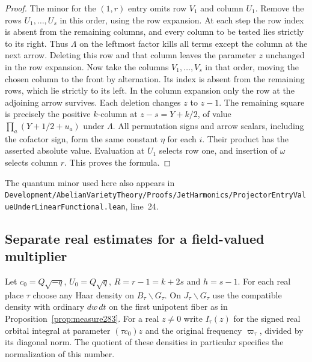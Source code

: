 \documentclass[a4paper,11pt]{article}
\theoremstyle{definition}
\theoremstyle{remark}
\newcommand{\srcloc}[2]{{\small\nolinkurl{#1.lean}}, line~#2}
\numberwithin{equation}{section}
\begin{document}
\begin{proof}
The minor for the \((1,r)\) entry omits row \(V_1\) and
column \(U_1\). Remove the rows \(U_1,\ldots,U_s\) in this
order, using the row expansion. At each step the row index is
absent from the remaining columns, and every column to be tested
lies strictly to its right. Thus \(\Lambda\) on the leftmost
factor kills all terms except the column at the next arrow.
Deleting this row and that column leaves the parameter \(z\)
unchanged in the row expansion. Now take the columns
\(V_1,\ldots,V_s\) in that order, moving the chosen column to
the front by alternation. Its index is absent from the remaining
rows, which lie strictly to its left. In the column expansion
only the row at the adjoining arrow survives. Each deletion
changes \(z\) to \(z-1\). The remaining square is precisely the
positive \(k\)-column at \(z-s=Y+k/2\), of value
\(\prod_a(Y+1/2+u_a)\) under \(\Lambda\).
All permutation signs and arrow scalars, including the cofactor
sign, form the same constant \(\eta\) for each \(i\). Their
product has the asserted absolute value. Evaluation at \(U_1\)
selects row one, and insertion of \(\omega\) selects column \(r\).
This proves the formula.
\end{proof}

The quantum minor used here also appears in
\srcloc{Development/AbelianVarietyTheory/Proofs/JetHarmonics/ProjectorEntryValueUnderLinearFunctional}{24}.

\subsection{Separate real estimates for a field-valued multiplier}\label{nav:V-50}
Let \(c_0=Q\sqrt{-q}\), \(U_0=Q\sqrt q\),
\(R=r-1=k+2s\) and \(h=s-1\). For each real place
\(\tau\) choose any Haar density on \(B_\tau\backslash G_\tau\).
On \(J_\tau\backslash G_\tau\) use the compatible density
with ordinary \(dw\,dt\) on the first unipotent fiber as in
Proposition~\ref{prop:measure283}. For a real \(z\ne0\)
write \(I_\tau(z)\) for the signed real orbital integral
at parameter \((\tau c_0)z\) and the original frequency
\(\varpi_\tau\), divided by its diagonal norm. The quotient
of these densities in particular specifies the normalization
of this number.
\end{document}
